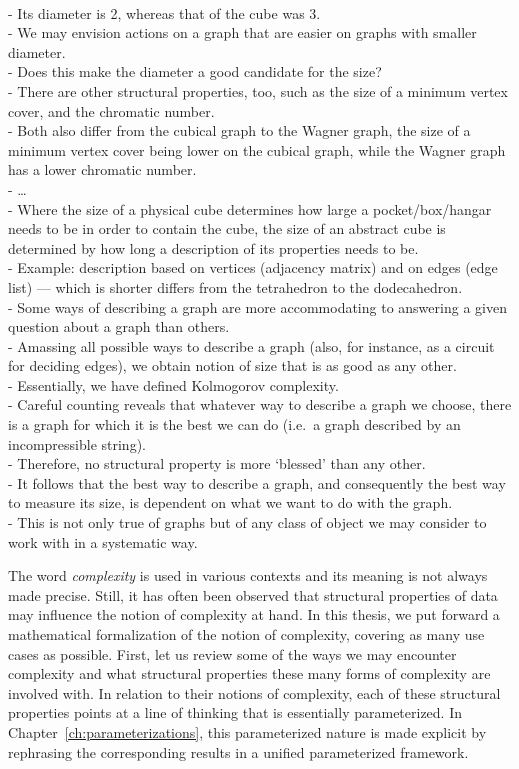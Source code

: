 {  \\- Its diameter is 2, whereas that of the cube was 3.
  \\- We may envision actions on a graph that are easier on graphs with smaller diameter.
  \\- Does this make the diameter a good candidate for the size?
  \\- There are other structural properties, too, such as the size of a minimum vertex cover, and the chromatic number.
  \\- Both also differ from the cubical graph to the Wagner graph, the size of a minimum vertex cover being lower on the cubical graph, while the Wagner graph has a lower chromatic number.
  \\- \ldots
  \\- Where the size of a physical cube determines how large a pocket/box/hangar needs to be in order to contain the cube, the size of an abstract cube is determined by how long a description of its properties needs to be.
  \\- Example: description based on vertices (adjacency matrix) and on edges (edge list) --- which is shorter differs from the tetrahedron to the dodecahedron.
  \\- Some ways of describing a graph are more accommodating to answering a given question about a graph than others.
  \\- Amassing all possible ways to describe a graph (also, for instance, as a circuit for deciding edges), we obtain notion of size that is as good as any other.
  \\- Essentially, we have defined Kolmogorov complexity.
  \\- Careful counting reveals that whatever way to describe a graph we choose, there is a graph for which it is the best we can do (i.e.~a graph described by an incompressible string).
  \\- Therefore, no structural property is more `blessed' than any other.
  \\- It follows that the best way to describe a graph, and consequently the best way to measure its size, is dependent on what we want to do with the graph.
  \\- This is not only true of graphs but of any class of object we may consider to work with in a systematic way.
}


\label{sec:history}%

The word \emph{complexity} is used in various contexts and its meaning is not always made precise.
Still, it has often been observed that structural properties of data may influence the notion of complexity at hand.
In this thesis, we put forward a mathematical formalization of the notion of complexity, covering as many use cases as possible.
First, let us review some of the ways we may encounter complexity and what structural properties these many forms of complexity are involved with.
In relation to their notions of complexity, each of these structural properties points at a line of thinking that is essentially parameterized.
In Chapter~\ref{ch:parameterizations}, this parameterized nature is made explicit by rephrasing the corresponding results in a unified parameterized framework.

